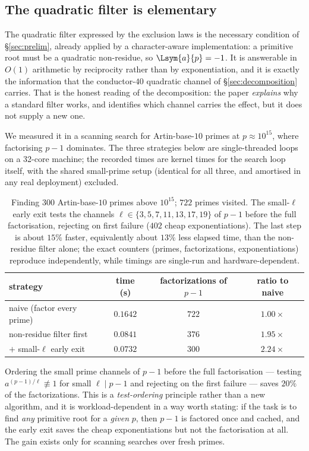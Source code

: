 \subsection*{The quadratic filter is elementary}
The quadratic filter expressed by the exclusion laws is the necessary condition of
\S\ref{sec:prelim}, already applied by a character-aware implementation: a primitive root
must be a quadratic non-residue, so $\Lsym{a}{p}=-1$. It is answerable in $O(1)$ arithmetic
by reciprocity rather than by exponentiation, and it is exactly the information that the
conductor-$40$ quadratic channel of \S\ref{sec:decomposition} carries. That is the honest reading
of the decomposition: the paper \emph{explains} why a standard filter works, and identifies which
channel carries the effect, but it does not supply a new one.

We measured it in a scanning search for Artin-base-$10$ primes at $p \approx 10^{15}$, where
factorising $p-1$ dominates. The three strategies below are single-threaded loops on a 32-core
machine; the recorded times are kernel times for the search loop itself, with the shared
small-prime setup (identical for all three, and amortised in any real deployment) excluded.

\begin{table}[t]
	\centering
	\begin{tabular}{lccc}
		\toprule
		strategy & time (s) & factorizations of $p-1$ & ratio to naive \\
		\midrule
		naive (factor every prime) & $0.1642$ & $722$ & $1.00\times$ \\
		non-residue filter first & $0.0841$ & $376$ & $1.95\times$ \\
		\quad $+$ small-$\ell$ early exit & $0.0732$ & $300$ & $2.24\times$ \\
		\bottomrule
	\end{tabular}
	\caption{Finding $300$ Artin-base-$10$ primes above $10^{15}$; $722$ primes visited. The
	small-$\ell$ early exit tests the channels $\ell \in \{3,5,7,11,13,17,19\}$ of $p-1$ before
	the full factorisation, rejecting on first failure ($402$ cheap exponentiations). The last
	step is about $15\%$ faster, equivalently about $13\%$ less elapsed time, than the
	non-residue filter alone; the exact counters (primes, factorizations, exponentiations)
	reproduce independently, while timings are single-run and hardware-dependent.}
	\label{tab:filter}
\end{table}

Ordering the small prime channels of $p-1$ before the full factorisation --- testing
$a^{(p-1)/\ell} \not\equiv 1$ for small $\ell \mid p-1$ and rejecting on the first failure ---
saves $20\%$ of the factorizations. This is a \emph{test-ordering} principle rather than a new
algorithm, and it is workload-dependent in a way worth stating: if the task is to find \emph{any}
primitive root for a \emph{given} $p$, then $p-1$ is factored once and cached, and the early exit
saves the cheap exponentiations but not the factorisation at all. The gain exists only for
scanning searches over fresh primes.

